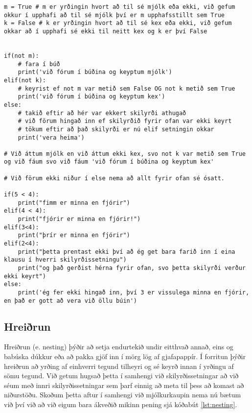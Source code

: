 \begin{lstlisting}[caption=elif notað, label=lst:elif]
m = True # m er yrðingin hvort að til sé mjólk eða ekki, við gefum okkur í upphafi að til sé mjólk því er m upphafsstillt sem True
k = False # k er yrðingin hvort að til sé kex eða ekki, við gefum okkar að í upphafi sé ekki til neitt kex og k er því False


if(not m):
	# fara í búð
	print('við fórum í búðina og keyptum mjólk')
elif(not k):
	# keyrist ef not m var metið sem False OG not k metið sem True
	print('við fórum í búðina og keyptum kex')
else:
	# takið eftir að hér var ekkert skilyrði athugað
	# við förum hingað inn ef skilyrðið fyrir ofan var ekki keyrt
	# tökum eftir að það skilyrði er nú elif setningin okkar
	print('vera heima')

# Við áttum mjólk en við áttum ekki kex, svo not k var metið sem True og við fáum svo við fáum 'við fórum í búðina og keyptum kex'

# Við förum ekki niður í else nema að allt fyrir ofan sé ósatt.

if(5 < 4):
	print("fimm er minna en fjórir")
elif(4 < 4):
	print("fjórir er minna en fjórir!")
elif(3<4):
	print("þrír er minna en fjórir")
elif(2<4):
	print("þetta prentast ekki því að ég get bara farið inn í eina klausu í hverri skilyrðissetningu")
	print("og það gerðist hérna fyrir ofan, svo þetta skilyrði verður ekki keyrt")
else:
	print('ég fer ekki hingað inn, því 3 er vissulega minna en fjórir, en það er gott að vera við öllu búin')
\end{lstlisting}

\subsection{Hreiðrun}\label{uk:hreiðrun}
Hreiðrun (e. nesting) þýðir að setja endurtekið undir eitthvað annað, eins og babúska dúkkur eða að pakka gjöf inn í mörg lög af gjafapappír.
Í forritun þýðir hreiðrun að yrðing af einhverri tegund tilheyri og sé keyrð innan í yrðingu af sömu tegund.
Við getum hugsað þetta í samhengi við skilyrðissetningar að við séum með innri skilyrðissetningar sem þarf einnig að meta til þess að komast að niðurstöðu.
Skoðum þetta aftur í samhengi við mjólkurkaupin nema nú bætum við því við að við eigum bara ákveðið mikinn pening sjá kóðabút \ref{lst:nesting}.

